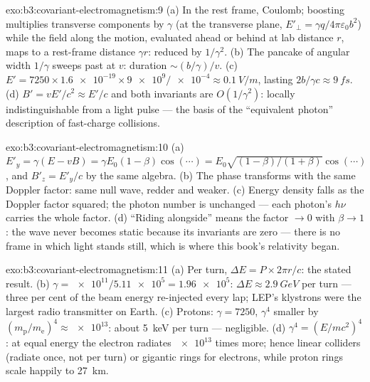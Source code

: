 \begin{solution}{exo:b3:covariant-electromagnetism:9}
(a) In the rest frame, Coulomb; boosting multiplies transverse
components by $\gamma$ (at the transverse plane, $E'_\perp = \gamma
q/4\pi\varepsilon_0b^2$) while the field along the motion, evaluated
ahead or behind at lab distance $r$, maps to a rest-frame distance
$\gamma r$: reduced by $1/\gamma^2$. (b) The pancake of angular width
$1/\gamma$ sweeps past at $v$: duration $\sim (b/\gamma)/v$. (c)
$E' = 7250 \times \num{1.6e-19} \times \num{9e9}/\num{e-4} \approx
\qty{0.1}{V/m}$, lasting $2b/\gamma c \approx \qty{9}{fs}$. (d)
$B' = vE'/c^2 \approx E'/c$ and both invariants are $O(1/\gamma^2)$:
locally indistinguishable from a light pulse --- the basis of the
``equivalent photon'' description of fast-charge collisions.
\end{solution}

\begin{solution}{exo:b3:covariant-electromagnetism:10}
(a) $E'_y = \gamma(E - vB) = \gamma E_0(1 - \beta)\cos(\cdots) =
E_0\sqrt{(1-\beta)/(1+\beta)}\cos(\cdots)$, and $B'_z = E'_y/c$ by
the same algebra. (b) The phase transforms with the same Doppler
factor: same null wave, redder and weaker. (c) Energy density falls
as the Doppler factor squared; the photon number is unchanged ---
each photon's $h\nu$ carries the whole factor. (d) ``Riding
alongside'' means the factor $\to 0$ with $\beta \to 1$: the wave
never becomes static because its invariants are zero --- there is no
frame in which light stands still, which is where this book's
relativity began.
\end{solution}

\begin{solution}{exo:b3:covariant-electromagnetism:11}
(a) Per turn, $\Delta E = P \times 2\pi r/c$: the stated result. (b)
$\gamma = \num{e11}/\num{5.11e5} = \num{1.96e5}$: $\Delta E \approx
\qty{2.9}{GeV}$ per turn --- three per cent of the beam energy
re-injected every lap; LEP's klystrons were the largest radio
transmitter on Earth. (c) Protons: $\gamma = 7250$, $\gamma^4$
smaller by $(m_{\text{p}}/m_{\text{e}})^4 \approx \num{e13}$: about
\qty{5}{keV} per turn --- negligible. (d) $\gamma^4 = (E/mc^2)^4$:
at equal energy the electron radiates $\num{e13}$ times more; hence
linear colliders (radiate once, not per turn) or gigantic rings for
electrons, while proton rings scale happily to \qty{27}{km}.
\end{solution}

